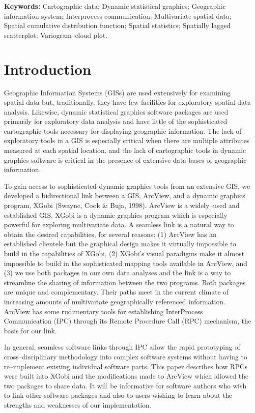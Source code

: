 {\bf Keywords:}
Cartographic data;
Dynamic statistical graphics; 
Geographic information system; 
Interprocess communication;
Multivariate spatial data;
Spatial cumulative distribution function;
Spatial statistics;
Spatially lagged scatterplot;
Variogram--cloud plot.

\normalsize


\section{Introduction}

Geographic Information Systems (GISs) are used extensively for
examining spatial data but, traditionally, they have few facilities
for exploratory spatial data analysis. Likewise, dynamic statistical
graphics software packages are used primarily for exploratory data
analysis and have little of the sophisticated cartographic tools
necessary for displaying geographic information. The lack of
exploratory tools in a GIS is especially critical when there are
multiple attributes measured at each spatial location, and the lack of
cartographic tools in dynamic graphics software is critical in the
presence of extensive data bases of geographic information.

To gain access to sophisticated dynamic graphics tools from an
extensive GIS, we developed a bidirectional link between a GIS,
ArcView, and a dynamic graphics program, XGobi (Swayne, Cook \&
Buja, 1998). ArcView is a widely--used and established GIS.  XGobi is
a dynamic graphics program which is especially powerful for exploring
multivariate data. A seamless link is a natural way to obtain the
desired capabilities, for several reasons: (1) ArcView has an
established clientele but the graphical design makes it virtually
impossible to build in the capabilities of XGobi, (2) XGobi's visual
paradigms make it almost impossible to build in the sophisticated
mapping tools available in ArcView, and (3) we use both packages in
our own data analyses and the link is a way to streamline the sharing
of information between the two programs. Both packages are unique and
complementary. Their paths meet in the current climate of increasing
amounts of multivariate geographically referenced information.
ArcView has some rudimentary tools for establishing InterProcess
Communication (IPC) through its Remote Procedure Call (RPC) mechanism, the
basis for our link.

In general, seamless software links through IPC allow the rapid
prototyping of cross--disciplinary methodology into complex
software systems without having to re--implement existing
individual software parts. This paper describes
how RPCs were built into XGobi and the modifications made to ArcView
which allowed the two packages to share data. It will be informative for
software authors who wish to link other software packages and also to
users wishing to learn about the strengths and weaknesses of our
implementation.

